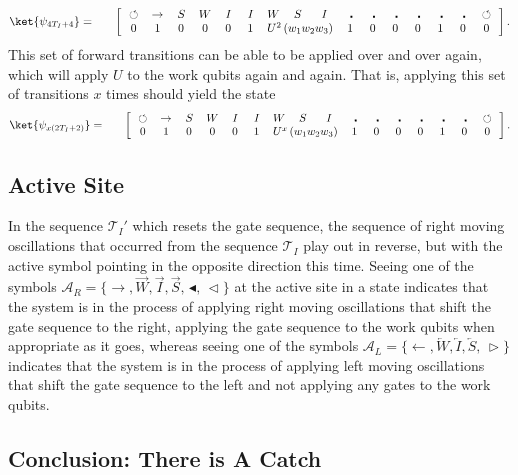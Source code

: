 \documentclass[11pt,letterpaper]{article}
\newcommand{\<}{\langle}
\renewcommand{\>}{\rangle}
\newcommand{\tur}{\,\circlearrowleft\,}   %
\newcommand{\gat}{\,\blacktriangleleft}  %
\newcommand{\mov}{\,\vartriangleleft}    %
\newcommand{\rmov}{\,\vartriangleright}
\newcommand{\bul}{\:\:\centerdot\:}       %
\newcommand{\iga}{\:I\,}                  %
\newcommand{\li}{\overleftarrow{I}}
\newcommand{\ri}{\overrightarrow{I}}
\newcommand{\wga}{W}						%
\newcommand{\lw}{\overleftarrow{W}}
\newcommand{\rw}{\overrightarrow{W}}
\newcommand{\sga}{\:S\,}					%
\newcommand{\ls}{\overleftarrow{S}}
\newcommand{\rs}{\overrightarrow{S}}
\begin{document}
\begin{eqnarray}
	\ket{\psi_{4T_I+4}} &=& \quad \left[ \begin{array}{cccccccccccccccc}
		\tur & \rightarrow & \sga & \wga & \iga & \iga & 
		\wga & \sga & \iga & \bul &
		\bul & \bul & \bul & \bul & \bul & \tur
		\\		
		0 & 1    & 0    & 0    & 0    & 1    & 
		\multicolumn{3}{c}{U^2\left(w_1w_2w_3\right)}
		 &
		1    & 0    & 0    & 0    & 1	& 0	& 0
 	\end{array} \right]. \label{psi2tp2}
\end{eqnarray}
This set of forward transitions can be able to be applied over and over again, which will apply $U$ to the work qubits again and again. That is, applying this set of transitions $x$ times should yield the state
\begin{eqnarray}
	\ket{\psi_{x(2T_I+2)}} &=& \quad \left[ \begin{array}{cccccccccccccccc}
		\tur & \rightarrow & \sga & \wga & \iga & \iga & 
		\wga & \sga & \iga & \bul &
		\bul & \bul & \bul & \bul & \bul & \tur
		\\		
		0 & 1    & 0    & 0    & 0    & 1    & 
		\multicolumn{3}{c}{U^x\left(w_1w_2w_3\right)}
		 &
		1    & 0    & 0    & 0    & 1	& 0	& 0
 	\end{array} \right]. \label{psi2tp2}
\end{eqnarray}

\subsection{Active Site}
In the sequence $\mathcal{T}_{I}'$ which resets the gate sequence, the sequence of right moving oscillations that occurred from the sequence $\mathcal{T}_{I}$ play out in reverse, but with the active symbol pointing in the opposite direction this time. Seeing one of the symbols $\mathcal{A}_R=\{\rightarrow,\rw,\ri,\rs,\gat,\mov\}$ at the active site in a state indicates that the system is in the process of applying right moving oscillations that shift the gate sequence to the right, applying the gate sequence to the work qubits when appropriate as it goes, whereas seeing one of the symbols $\mathcal{A}_L=\{\leftarrow,\lw,\li,\ls,\rmov\}$ indicates that the system is in the process of applying left moving oscillations that shift the gate sequence to the left and not applying any gates to the work qubits.

\subsection{Conclusion: There is A Catch}
\end{document}
